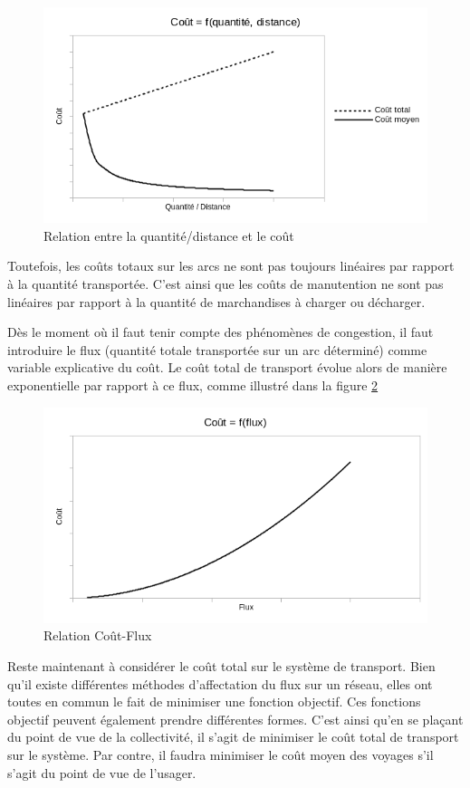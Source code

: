 \begin{figure}[htbp]
\centerline{\includegraphics[width=12cm]{f2_1.png}}
\caption{\label{f2_1} Relation entre la quantit\'e/distance et le co\^ut}
\end{figure}


Toutefois, les coûts totaux sur les arcs ne sont pas toujours linéaires par
rapport à la quantité transportée. C'est ainsi que les coûts de manutention ne
sont pas linéaires par rapport à la quantité de marchandises à charger ou
décharger.



Dès le moment où il faut tenir compte des phénomènes de congestion, il  faut
introduire le flux (quantité totale transportée sur un arc déterminé) comme
variable explicative du coût. Le coût total de transport évolue alors de manière
exponentielle par rapport à ce flux, comme illustré dans la figure \ref{f2_2}

\begin{figure}[htbp]
\centerline{\includegraphics[width=12cm]{f2_2.png}}
\caption{\label{f2_2} Relation Co\^ut-Flux}
\end{figure}


Reste maintenant à considérer le coût total sur le système de transport. Bien
qu'il existe différentes méthodes d'affectation du flux sur un réseau, elles ont
toutes en commun le fait de minimiser une fonction objectif. Ces fonctions
objectif peuvent également prendre différentes formes. C'est ainsi qu'en se
plaçant du point de vue de la collectivité, il s'agit de minimiser le coût total
de transport sur le système. Par contre, il faudra minimiser le coût moyen des
voyages s'il s'agit du point de vue de l'usager.

